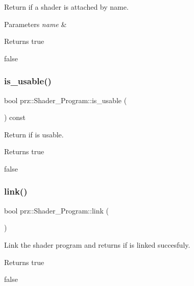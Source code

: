Return if a shader is attached by name. 


\begin{DoxyParams}{Parameters}
{\em name} & \\
\hline
\end{DoxyParams}
\begin{DoxyReturn}{Returns}
true 

false 
\end{DoxyReturn}
\mbox{\label{classprz_1_1_shader___program_a5e49c8f33174f2e198d7e9a2928f2be6}} 
\subsubsection{\texorpdfstring{is\_usable()}{is\_usable()}}
{\footnotesize\ttfamily bool prz\+::\+Shader\+\_\+\+Program\+::is\+\_\+usable (\begin{DoxyParamCaption}{ }\end{DoxyParamCaption}) const\hspace{0.3cm}{\ttfamily [inline]}}



Return if is usable. 

\begin{DoxyReturn}{Returns}
true 

false 
\end{DoxyReturn}
\mbox{\label{classprz_1_1_shader___program_a5a19bc3636c1b39cbf33739228dcfa34}} 
\subsubsection{\texorpdfstring{link()}{link()}}
{\footnotesize\ttfamily bool prz\+::\+Shader\+\_\+\+Program\+::link (\begin{DoxyParamCaption}{ }\end{DoxyParamCaption})}



Link the shader program and returns if is linked succesfuly. 

\begin{DoxyReturn}{Returns}
true 

false 
\end{DoxyReturn}
\mbox{\label{classprz_1_1_shader___program_a9370e9d2f79184492113936cdc79ca1f}} 
